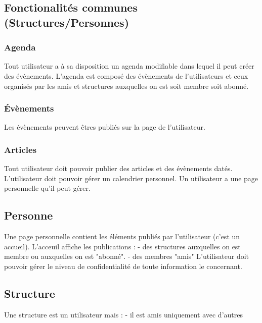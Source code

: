 \documentclass[11pt]{article}
\begin{document}
\subsection{Fonctionalités communes (Structures/Personnes)}

\subsubsection{Agenda}
\label{ssub:}

Tout utilisateur a à sa disposition un agenda modifiable dans lequel il peut créer des évènements.
L'agenda est composé des évènements de l'utilisateurs et ceux organisés par les amis et structures  auxquelles on est soit membre soit abonné.

\subsubsection{Évènements}

Les évènements peuvent êtres publiés sur la page de l'utilisateur.


\subsubsection{Articles}
\label{ssub:}

Tout utilisateur doit pouvoir publier des articles et des évènements datés.
L'utilisateur doit pouvoir gérer un calendrier personnel.
Un utilisateur a une page personnelle qu'il peut gérer.

\subsection{Personne}

Une page personnelle contient les éléments publiés par l'utilisateur (c'est un accueil).
L'acceuil affiche les publications :
  - des structures auxquelles on est membre ou auxquelles on est "abonné".
  - des membres "amis"
L'utilisateur doit pouvoir gérer le niveau de confidentialité de toute information le concernant.

\subsection{Structure}

Une structure est un utilisateur mais :
  - il est amis uniquement avec d'autres
\end{document}
